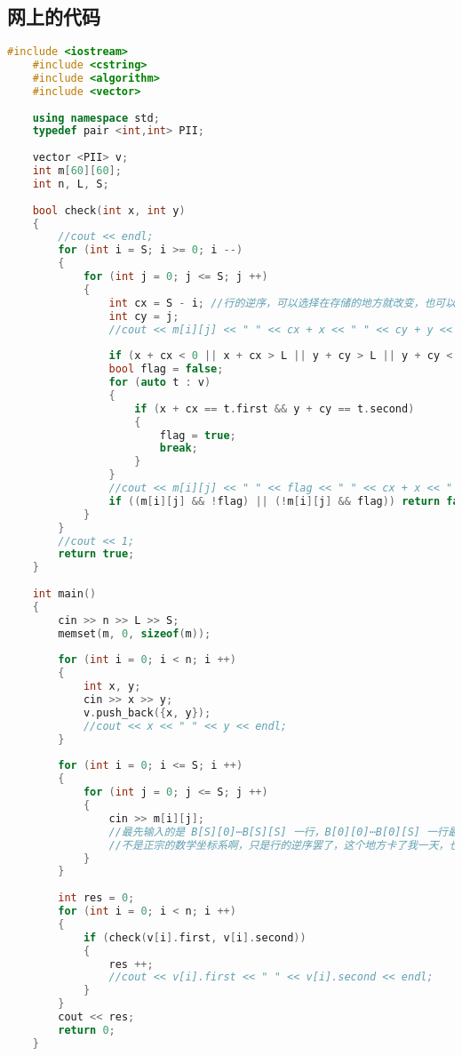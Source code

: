 \subsection{网上的代码}
\begin{lstlisting}[language=C++]
    #include <iostream>
    #include <cstring>
    #include <algorithm>
    #include <vector>
    
    using namespace std;
    typedef pair <int,int> PII;
    
    vector <PII> v;
    int m[60][60];
    int n, L, S;
    
    bool check(int x, int y)
    {
        //cout << endl;
        for (int i = S; i >= 0; i --)
        {
            for (int j = 0; j <= S; j ++)
            {
                int cx = S - i; //行的逆序，可以选择在存储的地方就改变，也可以在操作时计算原本的下标
                int cy = j;
                //cout << m[i][j] << " " << cx + x << " " << cy + y << endl;
    
                if (x + cx < 0 || x + cx > L || y + cy > L || y + cy < 0) return false; //如果小地图超出大地图的范围，停止
                bool flag = false;
                for (auto t : v)
                {
                    if (x + cx == t.first && y + cy == t.second)
                    {
                        flag = true;
                        break;
                    }
                }
                //cout << m[i][j] << " " << flag << " " << cx + x << " " << cy + y << endl;
                if ((m[i][j] && !flag) || (!m[i][j] && flag)) return false;
            }
        }
        //cout << 1;
        return true;
    }
    
    int main()
    {
        cin >> n >> L >> S;
        memset(m, 0, sizeof(m));
    
        for (int i = 0; i < n; i ++)
        {
            int x, y;
            cin >> x >> y;
            v.push_back({x, y});
            //cout << x << " " << y << endl;
        }
    
        for (int i = 0; i <= S; i ++)
        {
            for (int j = 0; j <= S; j ++)
            {
                cin >> m[i][j]; 
                //最先输入的是 B[S][0]⋯B[S][S] 一行，B[0][0]⋯B[0][S] 一行最后输入
                //不是正宗的数学坐标系啊，只是行的逆序罢了，这个地方卡了我一天，也是挺无语的
            }
        }
    
        int res = 0;
        for (int i = 0; i < n; i ++)
        {
            if (check(v[i].first, v[i].second))
            {
                res ++;
                //cout << v[i].first << " " << v[i].second << endl;
            }
        }
        cout << res;
        return 0;
    }    
\end{lstlisting}